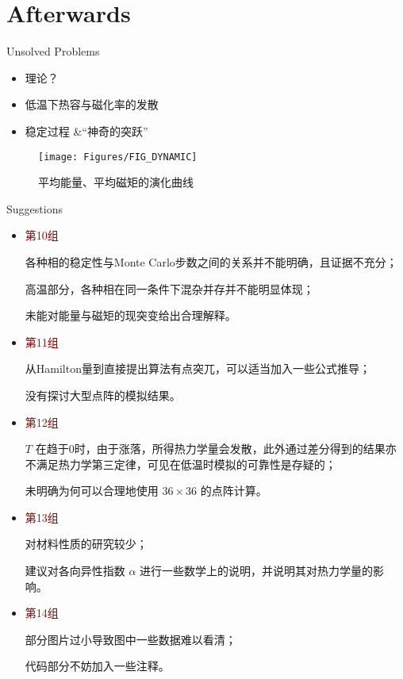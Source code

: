 \documentclass[UTF8, aspectratio = 43]{beamer}
\renewcommand{\emph}[1]{ \textcolor{darkred} {#1} }
\begin{document}
	\section{Afterwards}
		\begin{frame}{Unsolved Problems}
			\begin{itemize}
				\item 理论？ \pause
				\item 低温下热容与磁化率的发散 \pause
				\item 稳定过程 \&“神奇的突跃”
			\end{itemize}
			\begin{figure}
				\texttt{[image: Figures/FIG\_DYNAMIC]}
				\caption{平均能量、平均磁矩的演化曲线}
			\end{figure}
		\end{frame}
		
		\begin{frame}{Suggestions}
			\begin{itemize}
				\footnotesize
				\item \emph{第10组}
				
				各种相的稳定性与Monte Carlo步数之间的关系并不能明确，且证据不充分；
				
				高温部分，各种相在同一条件下混杂并存并不能明显体现；
				
				未能对能量与磁矩的现突变给出合理解释。
				
				\item \emph{第11组}
				
				从Hamilton量到直接提出算法有点突兀，可以适当加入一些公式推导；
				
				没有探讨大型点阵的模拟结果。
				
				\item \emph{第12组}
				
				$T$ 在趋于0时，由于涨落，所得热力学量会发散，此外通过差分得到的结果亦不满足热力学第三定律，可见在低温时模拟的可靠性是存疑的；
				
				未明确为何可以合理地使用 $36\times36$ 的点阵计算。
				
				\item \emph{第13组}
				
				对材料性质的研究较少；
				
				建议对各向异性指数 $\alpha$ 进行一些数学上的说明，并说明其对热力学量的影响。
				
				\item \emph{第14组}
				
				部分图片过小导致图中一些数据难以看清；
				
				代码部分不妨加入一些注释。
			\end{itemize}
		\end{frame}
		
\end{document}
